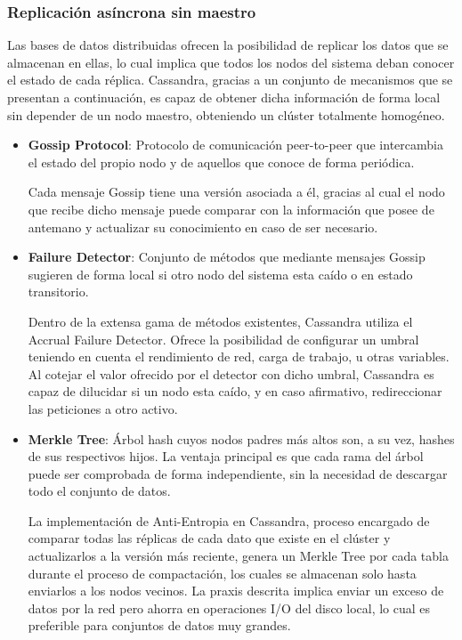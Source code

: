 \subsubsection{Replicación asíncrona sin maestro}

Las bases de datos distribuidas ofrecen la posibilidad de replicar los datos que se almacenan en ellas, lo cual implica que todos los nodos del sistema deban conocer el estado de cada réplica. Cassandra, gracias a un conjunto de mecanismos que se presentan a continuación, es capaz de obtener dicha información de forma local sin depender de un nodo maestro, obteniendo un clúster totalmente homogéneo.\\

\begin{itemize}

\item \textbf{Gossip Protocol}\cite{demers1987epidemic}: Protocolo de comunicación peer-to-peer que intercambia el estado del propio nodo y de aquellos que conoce de forma periódica.

Cada mensaje Gossip tiene una versión asociada a él, gracias al cual el nodo que recibe dicho mensaje puede comparar con la información que posee de antemano y actualizar su conocimiento en caso de ser necesario.
	
\item \textbf{Failure Detector}\cite{chandra1996unreliable}: Conjunto de métodos que mediante mensajes Gossip sugieren de forma local si otro nodo del sistema esta caído o en estado transitorio.

Dentro de la extensa gama de métodos existentes, Cassandra utiliza el Accrual Failure Detector\cite{hayashibara2004spl}. Ofrece la posibilidad de configurar un umbral teniendo en cuenta el rendimiento de red, carga de trabajo, u otras variables. Al cotejar el valor ofrecido por el detector con dicho umbral, Cassandra es capaz de dilucidar si un nodo esta caído, y en caso afirmativo, redireccionar las peticiones a otro activo.

\item \textbf{Merkle Tree}\cite{merkle1987digital}: Árbol hash cuyos nodos padres más altos son, a su vez, hashes de sus respectivos hijos. La ventaja principal es que cada rama del árbol puede ser comprobada de forma independiente, sin la necesidad de descargar todo el conjunto de datos.

La implementación de Anti-Entropia\cite{golay1949notes} en Cassandra, proceso encargado de comparar todas las réplicas de cada dato que existe en el clúster y actualizarlos a la versión más reciente, genera un Merkle Tree por cada tabla durante el proceso de compactación, los cuales se almacenan solo hasta enviarlos a los nodos vecinos. La praxis descrita implica enviar un exceso de datos por la red pero ahorra en operaciones I/O del disco local, lo cual es preferible para conjuntos de datos muy grandes.
	
\end{itemize}

